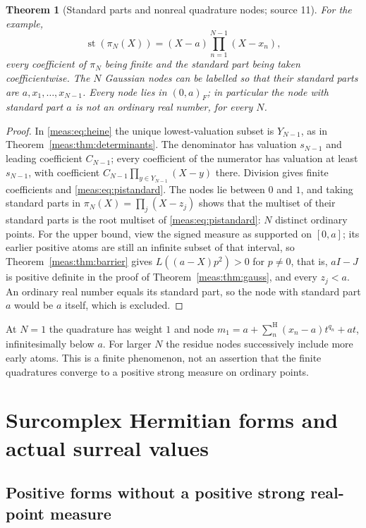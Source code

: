 \documentclass[11pt]{article}
\numberwithin{equation}{section}
\newtheorem{theorem}{Theorem}[section]
\theoremstyle{definition}
\theoremstyle{remark}
\newcommand{\st}{\operatorname{st}}
\newcommand{\hsum}{\mathop{\sum}\nolimits^{\mathrm H}}
\begin{document}
\begin{theorem}[Standard parts and nonreal quadrature nodes; source 11]
\label{meas:thm:quadratureresidues}
For the example,
\begin{equation}\label{meas:eq:pistandard}
 \st(\pi_N(X))=(X-a)\prod_{n=1}^{N-1}(X-x_n),
\end{equation}
every coefficient of $\pi_N$ being finite and the standard part being taken
coefficientwise. The $N$ Gaussian nodes can be labelled so that their standard
parts are $a,x_1,\ldots,x_{N-1}$. Every node lies in $(0,a)_F$; in particular the
node with standard part $a$ is not an ordinary real number, for every $N$.
\end{theorem}
\begin{proof}
In \eqref{meas:eq:heine} the unique lowest-valuation subset is $Y_{N-1}$, as in
Theorem~\ref{meas:thm:determinants}. The denominator has valuation $s_{N-1}$ and
leading coefficient $C_{N-1}$; every coefficient of the numerator has valuation
at least $s_{N-1}$, with coefficient $C_{N-1}\prod_{y\in Y_{N-1}}(X-y)$ there.
Division gives finite coefficients and \eqref{meas:eq:pistandard}. The nodes lie
between $0$ and $1$, and taking standard parts in $\pi_N(X)=\prod_j(X-z_j)$ shows
that the multiset of their standard parts is the root multiset of
\eqref{meas:eq:pistandard}: $N$ distinct ordinary points. For the upper bound,
view the signed measure as supported on $[0,a]$; its earlier positive atoms are
still an infinite subset of that interval, so Theorem~\ref{meas:thm:barrier}
gives $L((a-X)p^2)>0$ for $p\ne0$, that is, $aI-J$ is positive definite in the
proof of Theorem~\ref{meas:thm:gauss}, and every $z_j<a$. An ordinary real number
equals its standard part, so the node with standard part $a$ would be $a$
itself, which is excluded.
\end{proof}

At $N=1$ the quadrature has weight $1$ and node
$m_1=a+\hsum_n(x_n-a)t^{q_n}+at$, infinitesimally below $a$. For larger $N$ the
residue nodes successively include more early atoms. This is a finite
phenomenon, not an assertion that the finite quadratures converge to a positive
strong measure on ordinary points.

\section{Surcomplex Hermitian forms and actual surreal values}
\label{meas:sec:hermitian}

\subsection{Positive forms without a positive strong real-point measure}
\end{document}

